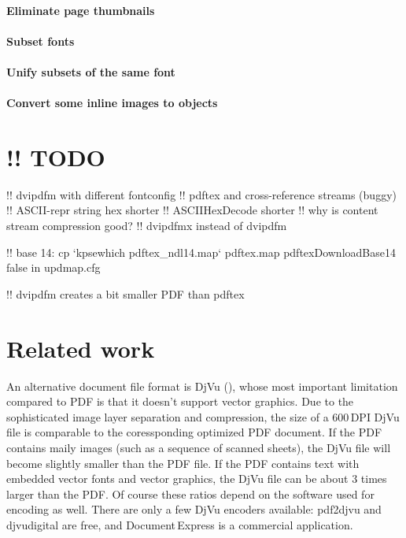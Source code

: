 \documentclass{ltugproc}
\def\cmd{\textsf}
\begin{document}
\paragraph{Eliminate page thumbnails}

\paragraph{Subset fonts}

\paragraph{Unify subsets of the same font}

\paragraph{Convert some inline images to objects}


\section{!! TODO}

!! dvipdfm with different fontconfig
!! pdftex and cross-reference streams (buggy)
!! ASCII-repr string hex shorter
!! ASCIIHexDecode shorter
!! why is content stream compression good?
!! dvipdfmx instead of dvipdfm

!! base 14: cp `kpsewhich pdftex\_ndl14.map` pdftex.map
pdftexDownloadBase14 false in updmap.cfg

!! dvipdfm creates a bit smaller PDF than pdftex

\section{Related work}\label{related-work}

An alternative document file format is DjVu (\cite{djvu,djvu-tutorial}),
whose most important limitation compared to PDF is that it doesn't support
vector graphics. Due to the sophisticated image layer separation and
compression, the size of a 600\,DPI DjVu file is comparable to the
coressponding optimized PDF document. If the PDF contains maily images (such
as a sequence of scanned sheets), the DjVu file will become slightly smaller
than the PDF file. If the PDF contains text with embedded vector fonts and
vector graphics, the DjVu file can be about 3 times larger than the PDF.
Of course these ratios depend on the software used for encoding as well.
There are only a few DjVu encoders available: \cmd{pdf2djvu} and
\cmd{djvudigital} are free, and Document\,Express is a commercial
application.
\end{document}
